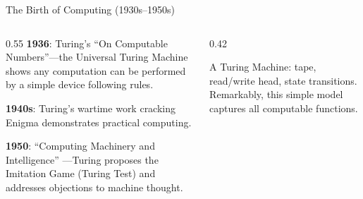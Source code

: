 \documentclass[aspectratio=169,11pt]{beamer}
\begin{document}
\begin{frame}{The Birth of Computing (1930s--1950s)}
\begin{columns}[T]
\begin{column}{0.55\textwidth}
\textbf{1936}: Turing's ``On Computable Numbers''---the Universal Turing Machine shows any computation can be performed by a simple device following rules.

\vspace{0.2em}
\textbf{1940s}: Turing's wartime work cracking Enigma demonstrates practical computing.

\vspace{0.2em}
\textbf{1950}: ``Computing Machinery and Intelligence'' \parencite{turing_computing_machinery}---Turing proposes the Imitation Game (Turing Test) and addresses objections to machine thought.
\end{column}
\begin{column}{0.42\textwidth}
\begin{center}
\end{center}

\vspace{0.2em}
{\scriptsize A Turing Machine: tape, read/write head, state transitions. Remarkably, this simple model captures all computable functions.}
\end{column}
\end{columns}
\end{frame}
\end{document}
